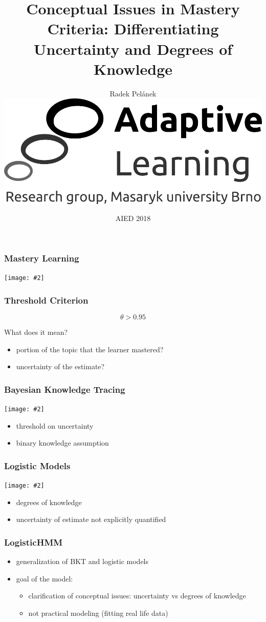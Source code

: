 \documentclass[bigger]{beamer}
\title{Conceptual Issues in Mastery Criteria: Differentiating Uncertainty and
  Degrees of Knowledge}
\author{Radek Pel\'anek\\[10mm]
\includegraphics[width=.3\linewidth]{al-logo}
}
\date{AIED 2018}
\newcommand{\img}[2]{
  \begin{center}
    \texttt{[image: \#2]}
  \end{center}
}
\begin{document}
\frame{\titlepage}

\begin{frame}
  \frametitle{Mastery Learning}

  \img{1}{mastery-learning}

\end{frame}

\begin{frame}
  \frametitle{Threshold Criterion}

  \[ \theta > 0.95 \]

  \begin{center}
    What does it mean?
  \end{center}

  \pause
  \bigskip

  \begin{itemize}
  \item portion of the topic that the learner mastered?
  \item uncertainty of the estimate?
  \end{itemize}
\end{frame}

\begin{frame}
  \frametitle{Bayesian Knowledge Tracing}

  \img{.5}{bkt}

  \begin{itemize}
  \item threshold on uncertainty
  \item binary knowledge assumption
  \end{itemize}
\end{frame}

\begin{frame}
  \frametitle{Logistic Models}

  \img{.5}{logistic}

  \begin{itemize}
  \item degrees of knowledge
  \item uncertainty of estimate not explicitly quantified
  \end{itemize}
\end{frame}

\begin{frame}
  \frametitle{LogisticHMM}

  \begin{itemize}
  \item generalization of BKT and logistic models
  \item goal of the model:
    \begin{itemize}
    \item clarification of conceptual issues: uncertainty vs degrees of
      knowledge
    \item not practical modeling (fitting real life data)
    \end{itemize}
  \end{itemize}
\end{frame}
\end{document}
